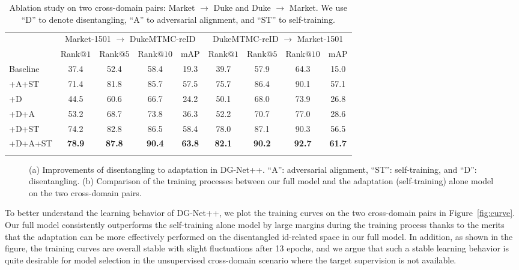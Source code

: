 \documentclass[runningheads]{llncs}
\begin{document}
\begin{table}[t]
\centering
\begin{tabular*}{\linewidth}{l|cccc|cccc}
\shline \
\multirow{2}{*}{Methods} & \multicolumn{4}{c|}{Market-1501 $\rightarrow$ DukeMTMC-reID} & \multicolumn{4}{c}{DukeMTMC-reID $\rightarrow$ Market-1501}\\
 & Rank$@1$ & Rank$@5$ & Rank$@10$ & mAP & Rank$@1$ & Rank$@5$ & Rank$@10$ & mAP \\ \hline
Baseline & 37.4 & 52.4 & 58.4 & 19.3 & 39.7 & 57.9 & 64.3 & 15.0 \\
+A+ST & 71.4 & 81.8 & 85.7 & 57.5 & 75.7 & 86.4 & 90.1 & 57.1 \\
+D & 44.5 & 60.6 & 66.7 & 24.2 & 50.1 & 68.0 & 73.9 & 26.8 \\
+D+A & 53.2 & 68.7 & 73.8 & 36.3 & 52.2 & 70.7 & 77.0 & 28.6 \\
+D+ST & 74.2 & 82.8 & 86.5 & 58.4 & 78.0 & 87.1 & 90.3 & 56.5 \\
+D+A+ST & \textbf{78.9} & \textbf{87.8} & \textbf{90.4} & \textbf{63.8} & \textbf{82.1} & \textbf{90.2} & \textbf{92.7} & \textbf{61.7}\\ 
\shline
\end{tabular*}
\vspace{1mm}
\caption{Ablation study on two cross-domain pairs: Market $\rightarrow$ Duke and Duke $\rightarrow$ Market. We use ``D'' to denote disentangling, ``A'' to adversarial alignment, and ``ST'' to self-training.}
\vspace{-10pt}
\label{tab:ablation}
\end{table}



\begin{figure}
\centering     {}
\subfigure[]{\label{fig:curve}\texttt{[image: figures/mAP\_curve.pdf]}}
\vspace{-.35cm}
\caption{(a) Improvements of disentangling to adaptation in DG-Net++. ``A'': adversarial alignment, ``ST'': self-training, and ``D'': disentangling. (b) Comparison of the training processes between our full model and the adaptation (self-training) alone model on the two cross-domain pairs.}
\end{figure}

To better understand the learning behavior of DG-Net++, we plot the training curves on the two cross-domain pairs in Figure~\ref{fig:curve}. Our full model consistently outperforms the self-training alone model by large margins during the training process thanks to the merits that the adaptation can be more effectively performed on the disentangled id-related space in our full model. In addition, as shown in the figure, the training curves are overall stable with slight fluctuations after 13 epochs, and we argue that such a stable learning behavior is quite desirable for model selection in the unsupervised cross-domain scenario where the target supervision is not available. 
\end{document}
